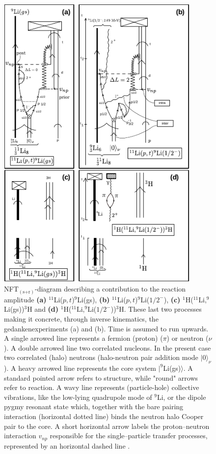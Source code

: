           \begin{figure}
          \centerline {
          \includegraphics*[width=10cm]{introduccion/figs/fig1_9_3xxx}
          }
          \caption[$^{11}$Li($p,t$)$^9$Li NFT$_{(\text{s+r})}$ diagram.]{ NFT$_{(\text{s+r})}$-diagram  describing a contribution to the reaction amplitude \textbf{(a)} $^{11}$Li($p,t$)$^9$Li(gs), \textbf{(b)} $^{11}$Li($p,t$)$^9$Li($1/2^-$), \textbf{(c)}  $^{1}$H($^{11}$Li,$^9$Li(gs))$^3$H and \textbf{(d)} $^{1}$H($^{11}$Li,$^9$Li($1/2^-$))$^3$H. These last two processes making it concrete, through inverse kinematics, the gedankenexperiments (a) and (b). Time is assumed to run upwards.
              	A single arrowed line represents a fermion (proton) ($\pi$) or neutron ($\nu$). A double arrowed line  two correlated nucleons. In the present case two correlated (halo) neutrons (halo-neutron pair addition mode $|0\rangle_{\nu}$). A heavy arrowed line represents  the core system $|^9$Li(gs)$\rangle$. A standard 
              	pointed arrow refers to structure, while "round" arrows refer to reaction. A wavy line represents (particle-hole) collective vibrations,
              	 like the low-lying quadrupole mode of $^9$Li, or the  dipole pygmy resonant state  which, together  with the bare pairing interaction (horizontal dotted line) binds the neutron  halo Cooper pair to the core.  A short horizontal arrow labels the proton--neutron interaction $v_{np}$ responsible for  the single--particle transfer  processes, represented by an horizontal dashed line .
}
\end{figure}

